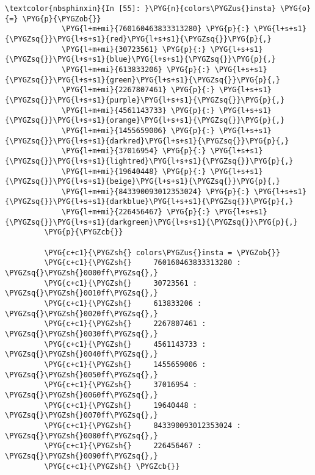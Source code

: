 \documentclass[letterpaper,10pt,english]{sphinxmanual}
\begin{document}
%
\begin{Verbatim}[commandchars=\\\{\}]
\textcolor{nbsphinxin}{In [55]: }\PYG{n}{colors\PYGZus{}insta} \PYG{o}{=} \PYG{p}{\PYGZob{}}
             \PYG{l+m+mi}{760160463833313280} \PYG{p}{:} \PYG{l+s+s1}{\PYGZsq{}}\PYG{l+s+s1}{red}\PYG{l+s+s1}{\PYGZsq{}}\PYG{p}{,}
             \PYG{l+m+mi}{30723561} \PYG{p}{:} \PYG{l+s+s1}{\PYGZsq{}}\PYG{l+s+s1}{blue}\PYG{l+s+s1}{\PYGZsq{}}\PYG{p}{,}
             \PYG{l+m+mi}{613833206} \PYG{p}{:} \PYG{l+s+s1}{\PYGZsq{}}\PYG{l+s+s1}{green}\PYG{l+s+s1}{\PYGZsq{}}\PYG{p}{,}
             \PYG{l+m+mi}{2267807461} \PYG{p}{:} \PYG{l+s+s1}{\PYGZsq{}}\PYG{l+s+s1}{purple}\PYG{l+s+s1}{\PYGZsq{}}\PYG{p}{,}
             \PYG{l+m+mi}{4561143733} \PYG{p}{:} \PYG{l+s+s1}{\PYGZsq{}}\PYG{l+s+s1}{orange}\PYG{l+s+s1}{\PYGZsq{}}\PYG{p}{,}
             \PYG{l+m+mi}{1455659006} \PYG{p}{:} \PYG{l+s+s1}{\PYGZsq{}}\PYG{l+s+s1}{darkred}\PYG{l+s+s1}{\PYGZsq{}}\PYG{p}{,}
             \PYG{l+m+mi}{37016954} \PYG{p}{:} \PYG{l+s+s1}{\PYGZsq{}}\PYG{l+s+s1}{lightred}\PYG{l+s+s1}{\PYGZsq{}}\PYG{p}{,}
             \PYG{l+m+mi}{19640448} \PYG{p}{:} \PYG{l+s+s1}{\PYGZsq{}}\PYG{l+s+s1}{beige}\PYG{l+s+s1}{\PYGZsq{}}\PYG{p}{,}
             \PYG{l+m+mi}{843390093012353024} \PYG{p}{:} \PYG{l+s+s1}{\PYGZsq{}}\PYG{l+s+s1}{darkblue}\PYG{l+s+s1}{\PYGZsq{}}\PYG{p}{,}
             \PYG{l+m+mi}{226456467} \PYG{p}{:} \PYG{l+s+s1}{\PYGZsq{}}\PYG{l+s+s1}{darkgreen}\PYG{l+s+s1}{\PYGZsq{}}\PYG{p}{,}
         \PYG{p}{\PYGZcb{}}
         
         \PYG{c+c1}{\PYGZsh{} colors\PYGZus{}insta = \PYGZob{}}
         \PYG{c+c1}{\PYGZsh{}     760160463833313280 : \PYGZsq{}\PYGZsh{}0000ff\PYGZsq{},}
         \PYG{c+c1}{\PYGZsh{}     30723561 : \PYGZsq{}\PYGZsh{}0010ff\PYGZsq{},}
         \PYG{c+c1}{\PYGZsh{}     613833206 : \PYGZsq{}\PYGZsh{}0020ff\PYGZsq{},}
         \PYG{c+c1}{\PYGZsh{}     2267807461 : \PYGZsq{}\PYGZsh{}0030ff\PYGZsq{},}
         \PYG{c+c1}{\PYGZsh{}     4561143733 : \PYGZsq{}\PYGZsh{}0040ff\PYGZsq{},}
         \PYG{c+c1}{\PYGZsh{}     1455659006 : \PYGZsq{}\PYGZsh{}0050ff\PYGZsq{},}
         \PYG{c+c1}{\PYGZsh{}     37016954 : \PYGZsq{}\PYGZsh{}0060ff\PYGZsq{},}
         \PYG{c+c1}{\PYGZsh{}     19640448 : \PYGZsq{}\PYGZsh{}0070ff\PYGZsq{},}
         \PYG{c+c1}{\PYGZsh{}     843390093012353024 : \PYGZsq{}\PYGZsh{}0080ff\PYGZsq{},}
         \PYG{c+c1}{\PYGZsh{}     226456467 : \PYGZsq{}\PYGZsh{}0090ff\PYGZsq{},}
         \PYG{c+c1}{\PYGZsh{} \PYGZcb{}}
\end{Verbatim}
\end{document}

